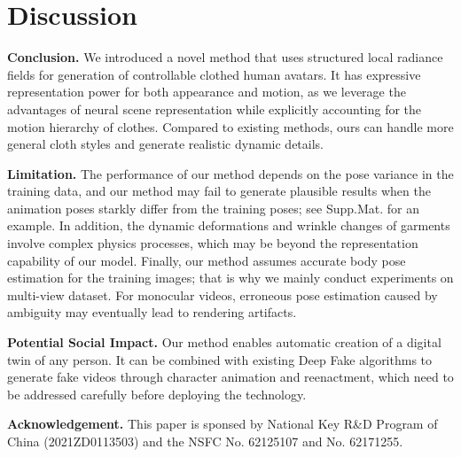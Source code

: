 \section{Discussion}
\label{sec:discussion}
\noindent\textbf{Conclusion.}
We introduced a novel method that uses structured local radiance fields for generation of controllable clothed human avatars. It has expressive representation power for both appearance and motion, as we leverage the advantages of neural scene representation while explicitly accounting for the motion hierarchy of clothes. Compared to existing methods, ours can handle more general cloth styles and generate realistic dynamic details. 



\noindent\textbf{Limitation.}
The performance of our method depends on the pose variance in the training data, and our method may fail to generate plausible results when the animation poses starkly differ from the training poses; see Supp.Mat. for an example. 
In addition, the dynamic deformations and wrinkle changes of garments involve complex physics processes, which may be beyond the representation capability of our model. 
Finally, our method assumes accurate body pose estimation for the training images; that is why we mainly conduct experiments on multi-view dataset. For monocular videos, erroneous pose estimation caused by ambiguity may eventually lead to rendering artifacts.  



\noindent\textbf{Potential Social Impact.}
Our method enables automatic creation of a digital twin of any person. It can be combined with existing Deep Fake algorithms to generate fake videos through character animation and reenactment, which need to be addressed carefully before deploying the technology. 


\noindent\textbf{Acknowledgement.}
This paper is sponsed by National Key R\&D Program of China (2021ZD0113503) and the NSFC No. 62125107 and No. 62171255.